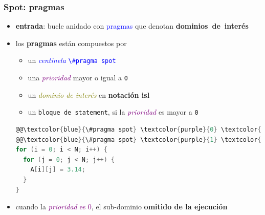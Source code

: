 \documentclass{beamer}\usetheme{Madrid} %
\begin{document}
\begin{frame}[fragile]
\frametitle{Spot: pragmas}
\begin{itemize}
	\item \textbf{entrada}: bucle anidado con \textcolor{blue}{pragmas} que denotan  \textbf{dominios~de~interés}
	\item los \textbf{pragmas} están compuestos por 
	\begin{itemize}
		\item un \textcolor{blue}{\textit{centinela}} \textcolor{blue}{\lstinline{\#pragma spot}}
		\item una \textcolor{purple}{\textit{prioridad}} mayor o igual a \lstinline{0}
		\item un \textcolor{olive}{\textit{dominio de interés}} en \textbf{\textbf{notación isl}}
		\item un \lstinline{bloque de statement}, si la \textcolor{purple}{\textit{prioridad}} es mayor a \lstinline{0} 
    \end{itemize}
\begin{block}{}
\begin{lstlisting}[basicstyle=\scriptsize,language=C]
@@\textcolor{blue}{\#pragma spot} \textcolor{purple}{0} \textcolor{olive}{[N] -\textgreater \{ [i, j] \textbar  0\textless=i\textless=3 and 0\textless=j\textless=3\}}@^
@@\textcolor{blue}{\#pragma spot} \textcolor{purple}{1} \textcolor{olive}{[N] -\textgreater \{ [i, j] \textbar  5\textless=i\textless=8 and 2\textless=j\textless=9\}}@^ A[i][j] = 1.11; 
for (i = 0; i < N; i++) {
  for (j = 0; j < N; j++) {
    A[i][j] = 3.14;
  }
}
\end{lstlisting}
\end{block}
\item cuando la \textcolor{purple}{\textit{prioridad} es 0}, el sub-dominio \textbf{omitido de la ejecución}
\end{itemize}
\end{frame}
\end{document}
